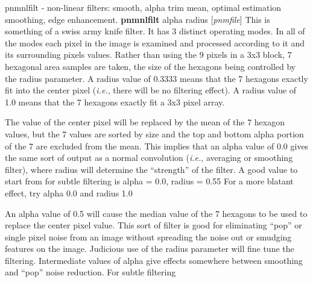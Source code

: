 %

\newpage
%

pnmnlfilt - non-linear filters: smooth, alpha trim mean, optimal
estimation smoothing, edge enhancement.
{\bf pnmnlfilt}
{\rm alpha}
{\rm radius}
{\rm [}{\it pnmfile}{\rm ]}
This is something of a swiss army knife filter. It has 3 distinct operating
modes. In all of the modes each pixel in the image is examined and processed
according to it and its surrounding pixels values. Rather than using the
9 pixels in a 3x3 block, 7 hexagonal area samples are taken, the size of
the hexagons being controlled by the radius parameter. A radius value of
0.3333 means that the 7 hexagons exactly fit into the center pixel ({\it i.e.},
there will be no filtering effect). A radius value of 1.0 means that
the 7 hexagons exactly fit a 3x3 pixel array.
\par
The value of the center pixel will be
replaced by the mean of the 7 hexagon values, but the 7 values are
sorted by size and the top and bottom alpha portion of the 7 are
excluded from the mean.  This implies that an alpha value of 0.0 gives
the same sort of output as a normal convolution ({\it i.e.}, averaging or
smoothing filter), where radius will determine the ``strength'' of the
filter. A good value to start from for subtle filtering is alpha = 0.0, radius = 0.55
For a more blatant effect, try alpha 0.0 and radius 1.0
\par
An alpha value of 0.5 will cause the median value of the
7 hexagons to be used to replace the center pixel value. This sort
of filter is good for eliminating ``pop'' or single pixel noise from
an image without spreading the noise out or smudging features on
the image. Judicious use of the radius parameter will fine tune the
filtering. Intermediate values of alpha give effects somewhere
between smoothing and ``pop'' noise reduction. For subtle filtering
